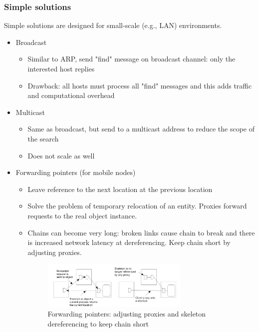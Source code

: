 \documentclass[10pt,a4paper]{article}
\begin{document}
\subsubsection{Simple solutions}
Simple solutions are designed for small-scale (e.g., LAN) environments.
\begin{itemize}
	\item Broadcast
	\begin{itemize}
		\item Similar to ARP, send "find" message on broadcast channel: only the interested host replies
		\item Drawback: all hosts must process all "find" messages and this adds traffic and computational overhead
	\end{itemize}
	\item Multicast
	\begin{itemize}
		\item Same as broadcast, but send to a multicast address to reduce the scope of the search
		\item Does not scale as well
	\end{itemize}
	\item Forwarding pointers (for mobile nodes)
	\begin{itemize}
		\item Leave reference to the next location at the previous location
		\item Solve the problem of temporary relocation of an entity. Proxies forward requests to the real object instance.
		\item Chains can become very long: broken links cause chain to break and there is increased network latency at dereferencing. Keep chain short by adjusting proxies.
		 \begin{figure}[h!]
 \hfill \includegraphics[width=200pt]{images/forwarding-pointers.png}\hspace*{\fill}
 \caption{Forwarding pointers: adjusting proxies and skeleton dereferencing to keep chain short}
  \label{fig:forw-point}
\end{figure} \\
	\end{itemize}
\end{itemize}
\pagebreak
\end{document}

